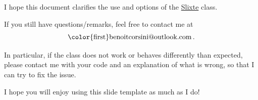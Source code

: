 \documentclass{slixte}
\def\clsurl{https://ctan.org/pkg/slixte}
\newcommand{\slixte}{\href{\clsurl}{\color{first}Slixte}}
\begin{document}
\begin{slide}[Conclusion]
    I hope this document clarifies the use and options of the \slixte{} class.

    \spacing[1]

    If you still have questions/remarks, feel free to contact me at
    \[
        \textrm{\makeatletter\color{first}benoitcorsini@outlook.com\makeatother}\,.
    \]

    \spacing[1]

    In particular, if the class does not work or behaves differently than expected, please contact me with your code and an explanation of what is wrong, so that I can try to fix the issue.

    \spacing[3]

    I hope you will enjoy using this slide template as much as I do!
\end{slide}

\togglefalse{qr}

\finalpage
\end{document}
